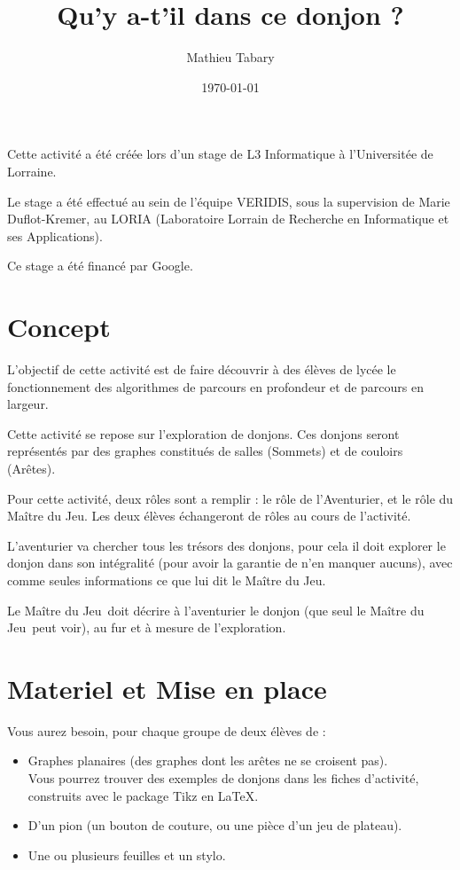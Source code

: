 \documentclass{article}
\title{Qu'y a-t'il dans ce donjon ?}
\author{Mathieu Tabary}
\date{\today}
\newcommand{\mj}{Maître du Jeu}
\begin{document}
\maketitle

Cette activité a été créée lors d'un stage de L3 Informatique à l'Universitée de Lorraine.

Le stage a été effectué au sein de l'équipe VERIDIS, sous la supervision de Marie Duflot-Kremer, au LORIA (Laboratoire Lorrain de Recherche en Informatique et ses Applications).

Ce stage a été financé par Google.

\doclicenseThis

\part{Concept}
    L'objectif de cette activité est de faire découvrir à des élèves de lycée le fonctionnement des algorithmes de parcours en profondeur et de parcours en largeur.

    Cette activité se repose sur l'exploration de donjons. Ces donjons seront représentés par des graphes constitués de salles (Sommets) et de couloirs (Arêtes).


    \bigskip
    Pour cette activité, deux rôles sont a remplir : le rôle de l'Aventurier, et le rôle du \mj. Les deux élèves échangeront de rôles au cours de l'activité.

    L'aventurier va chercher tous les trésors des donjons, pour cela il doit explorer le donjon dans son intégralité (pour avoir la garantie de n'en manquer aucuns), avec comme seules informations ce que lui dit le \mj.

    Le \mj\ doit décrire à l'aventurier le donjon (que seul le \mj\ peut voir), au fur et à mesure de l'exploration.

\part{Materiel et Mise en place}
    Vous aurez besoin, pour chaque groupe de deux élèves de :
    \begin{itemize}
        \item Graphes planaires (des graphes dont les arêtes ne se croisent pas).\\
        Vous pourrez trouver des exemples de donjons dans les fiches d'activité, construits avec le package Tikz en \LaTeX{}.
        \item D'un pion (un bouton de couture, ou une pièce d'un jeu de plateau).
        \item Une ou plusieurs feuilles et un stylo.
    \end{itemize}
\end{document}
